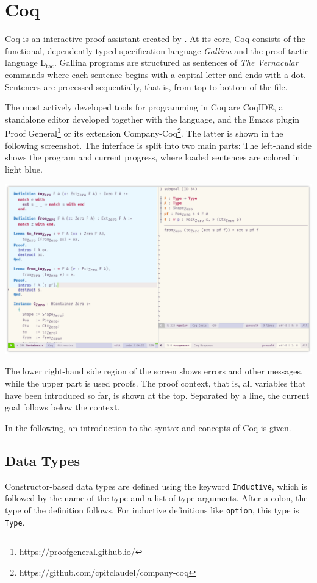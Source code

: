 \documentclass[a4paper, 11pt, fleqn, twoside]{scrreprt}
\newcommand{\cinl}[1]{\texttt{#1}}
\begin{document}
\section{Coq}
\label{sec:coqIntro}

Coq is an interactive proof assistant created by \citet{coq2019}.
At its core, Coq consists of the functional, dependently typed specification language \textit{Gallina} and the proof tactic language L$_\text{tac}$.
Gallina programs are structured as sentences of \textit{The Vernacular} commands where each sentence begins with a capital letter and ends with a dot.
Sentences are processed sequentially, that is, from top to bottom of the file.

The most actively developed tools for programming in Coq are CoqIDE, a standalone editor developed together with the language, and the Emacs plugin Proof General\footnote{https://proofgeneral.github.io/} or its extension Company-Coq\footnote{https://github.com/cpitclaudel/company-coq}.
The latter is shown in the following screenshot.
The interface is split into two main parts: The left-hand side shows the program and current progress, where loaded sentences are colored in light blue.

\begin{center}
\includegraphics[width=\textwidth]{img/coq.png}
\end{center}

The lower right-hand side region of the screen shows errors and other messages, while the upper part is used proofs.
The proof context, that is, all variables that have been introduced so far, is shown at the top.
Separated by a line, the current goal follows below the context.

In the following, an introduction to the syntax and concepts of Coq is given.

\subsection{Data Types}
Constructor-based data types are defined using the keyword \cinl{Inductive}, which is followed by the name of the type and a list of type arguments.
After a colon, the type of the definition follows.
For inductive definitions like \cinl{option}, this type is \cinl{Type}.
\end{document}
